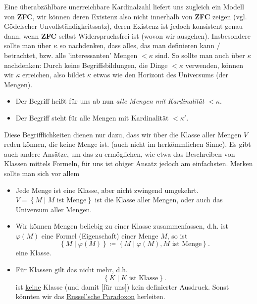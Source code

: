 \begin{remark*}
    Eine überabzählbare unerreichbare Kardinalzahl liefert uns zugleich ein Modell von \textbf{ZFC}, wir können deren Existenz also nicht innerhalb von \textbf{ZFC} zeigen (vgl. Gödelscher Unvollständigkeitssatz), deren Existenz ist jedoch konsistent genau dann, wenn \textbf{ZFC} selbst Widerspruchsfrei ist (wovon wir ausgehen). Insbesondere sollte man über  $κ$ so nachdenken, dass alles, das man definieren kann / betrachtet, bzw. alle 'interessanten' Mengen  $<κ$ sind. So sollte man auch über  $κ$ nachdenken: Durch keine Begriffsbildungen, die Dinge  $<κ$ verwenden, können wir  $κ$ erreichen, also bildet  $κ$ etwas wie den Horizont des Universums (der Mengen).
\end{remark*}

\begin{definition}\label{def:menge-klasse}
    \begin{itemize}
        \item 
            Der Begriff  heißt für uns ab nun \textit{alle Mengen mit Kardinalität $<κ$}. 
   \item Der Begriff  steht für alle Mengen mit Kardinalität $<κ'$. 
    \end{itemize}
\end{definition}

\begin{remark*}
    Diese Begrifflichkeiten dienen nur dazu, dass wir über die Klasse aller Mengen $V$ reden können, die keine Menge ist. (auch nicht im herkömmlichen Sinne). Es gibt auch andere Ansätze, um das zu ermöglichen, wie etwa das Beschreiben von Klassen mittels Formeln, für uns ist obiger Ansatz jedoch am einfachsten. Merken sollte man sich vor allem
    \begin{itemize}
        \item Jede Menge ist eine Klasse, aber nicht zwingend umgekehrt. $V = \left \{M \mid  M \text{ ist Menge}\right\} $ ist die Klasse aller Mengen, oder auch das Universum aller Mengen.
        \item Wir können Mengen beliebig zu einer Klasse zusammenfassen, d.h. ist $\varphi (M)$ eine Formel (Eigenschaft) einer Menge $M$, so ist
             \[
                 \left \{M \mid  \varphi (M)\right\} \coloneqq  \left \{M  \mid  \varphi (M) , M \text{ ist Menge}\right\} 
            .\] 
            eine Klasse.
        \item Für Klassen gilt das nicht mehr, d.h. 
            \[
            \left \{K \mid K \text{ ist Klasse}\right\} 
            .\] 
            ist \underline{keine} Klasse (und damit [für uns]) kein definierter Ausdruck. Sonst könnten wir das \href{https://en.wikipedia.org/wiki/Russell%27s_paradox}{Russel'sche Paradoxon} herleiten.
    \end{itemize}
\end{remark*}



